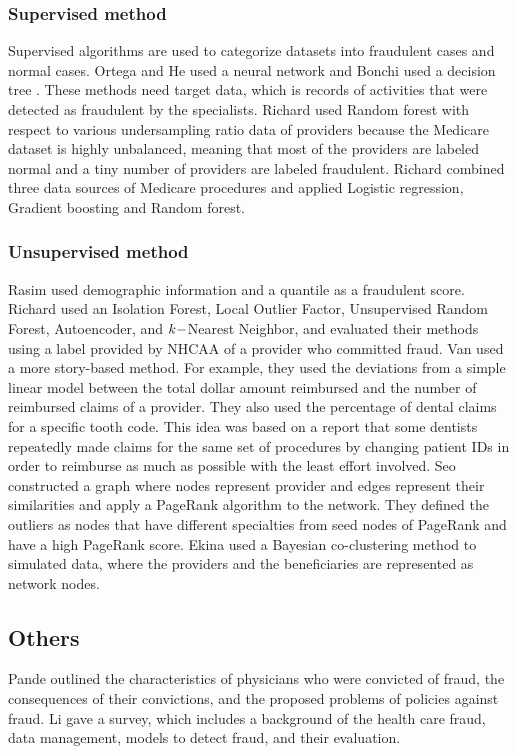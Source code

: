 \documentclass[dvipdfmx, english]{ampmt}             %
\begin{document}
\subsubsection*{Supervised method}
Supervised algorithms are used to categorize datasets into fraudulent cases and normal cases. 
Ortega and He used a neural network\cite{Ortega, Neuralnet} and Bonchi used a decision tree \cite{Bonchi}. These methods need target data, which is records of activities that were detected as fraudulent by the specialists.
Richard\cite{RichardRF} used Random forest with respect to various undersampling ratio data of providers because the Medicare dataset is highly unbalanced, meaning that most of the providers are labeled normal and a tiny number of providers are labeled fraudulent. 
Richard\cite{RichardMultiple} combined three data sources of Medicare procedures and applied Logistic regression, Gradient boosting and Random forest. 

\subsubsection*{Unsupervised method}
Rasim\cite{TwoModels} used demographic information and a quantile as a fraudulent score.
Richard\cite{RichardUnsupervised} used an Isolation Forest, Local Outlier Factor, Unsupervised Random Forest, Autoencoder, and $k\--$Nearest Neighbor, and evaluated their methods using a label provided by NHCAA of a provider who committed fraud.
Van\cite{Van} used a more story-based method. For example, they used the deviations from a simple linear model between the total dollar amount reimbursed and the number of reimbursed claims of a provider. They also used the percentage of dental claims for a specific tooth code. This idea was based on a report that some dentists repeatedly made claims for the same set of procedures by changing patient IDs in order to reimburse as much as possible with the least effort involved. Seo\cite{Seo2017Identifying} constructed a graph where nodes represent provider and edges represent their similarities and apply a PageRank algorithm to the network. They defined the outliers as nodes that have different specialties from seed nodes of PageRank and have a high PageRank score. Ekina \cite{ekina2013application} used a Bayesian co-clustering method to simulated data, where the providers and the beneficiaries are represented as network nodes.

\subsection*{Others}
Pande\cite{Pande} outlined the characteristics of physicians who were convicted of fraud, the consequences of their convictions, and the proposed problems of policies against fraud.
Li \cite{Survey} gave a survey, which includes a background of the health care fraud, data management, 
models to detect fraud, and their evaluation.
\end{document}
